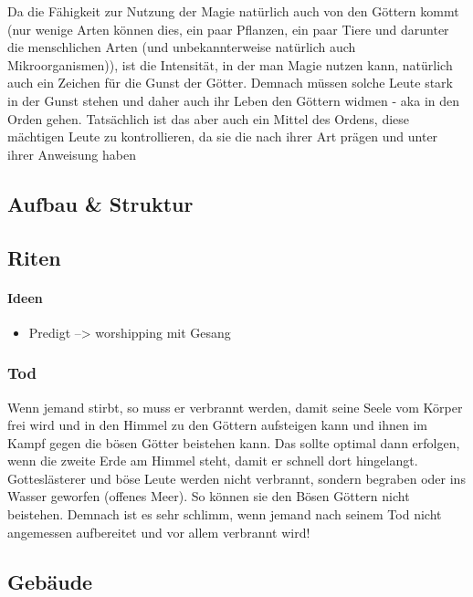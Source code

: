 Da die Fähigkeit zur Nutzung der Magie natürlich auch von den Göttern kommt (nur wenige Arten können dies, ein paar Pflanzen, ein paar Tiere und darunter die menschlichen Arten (und unbekannterweise natürlich auch Mikroorganismen)), ist die Intensität, in der man Magie nutzen kann, natürlich auch ein Zeichen für die Gunst der Götter. Demnach müssen solche Leute stark in der Gunst stehen und daher auch ihr Leben den Göttern widmen - aka in den Orden gehen. Tatsächlich ist das aber auch ein Mittel des Ordens, diese mächtigen Leute zu kontrollieren, da sie die nach ihrer Art prägen und unter ihrer Anweisung haben

\subsection{Aufbau \& Struktur}

\subsection{Riten}
\paragraph{Ideen}
\begin{itemize}
	\item Predigt --> worshipping mit Gesang
\end{itemize}

\subsubsection{Tod}
Wenn jemand stirbt, so muss er verbrannt werden, damit seine Seele vom Körper frei wird und in den Himmel zu den Göttern aufsteigen kann und ihnen im Kampf gegen die bösen Götter beistehen kann. Das sollte optimal dann erfolgen, wenn die zweite Erde am Himmel steht, damit er schnell dort hingelangt. 
Gotteslästerer und böse Leute werden nicht verbrannt, sondern begraben oder ins Wasser geworfen (offenes Meer). So können sie den Bösen Göttern nicht beistehen.
Demnach ist es sehr schlimm, wenn jemand nach seinem Tod nicht angemessen aufbereitet und vor allem verbrannt wird!

\subsection{Gebäude}
